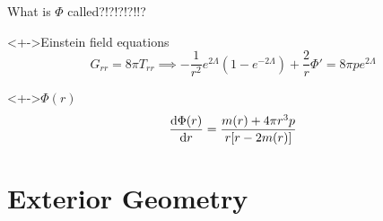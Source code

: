 \documentclass{beamer}
\let\svthefootnote\thefootnote
\newcommand\blankfootnote[1]{%
  \let\thefootnote\relax\footnotetext{#1}%
  \let\thefootnote\svthefootnote%
}
\begin{document}
\begin{frame}{What is $\Phi$ called?!?!?!?!!?}

\begin{block}<+->{Einstein field equations}
\begin{displaymath}
  G_{rr} = 8 \pi T_{rr}
  \implies
 -\frac{1}{r^2} e^{2\Lambda} (1 - e^{-2\Lambda}) + \frac{2}{r} \Phi' =
  8\pi p e^{2\Lambda}
\end{displaymath}
\end{block}

\begin{block}<+->{$\Phi(r)$}
\begin{displaymath}
  \dv{\Phi(r)}{r} = \frac{m(r) + 4 \pi r^3 p}{r [r - 2 m(r)]}
\end{displaymath}
\end{block}

\blankfootnote{\textcite[pp. 260--262]{Schutz}}



\end{frame}




\section{Exterior Geometry}
\end{document}
